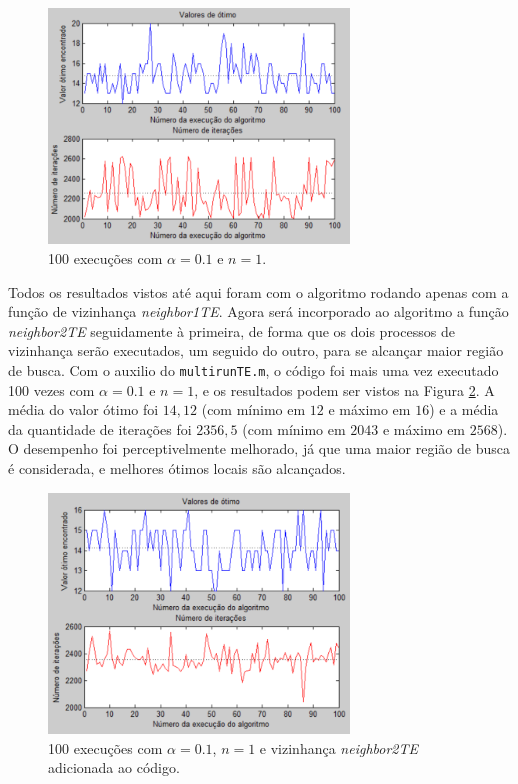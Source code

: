 \documentclass[conference]{IEEEtran}
\begin{document}
	\begin{figure}[h]
		\centering
		\includegraphics[width=8cm]{img/mult-result-5.png}
		\caption{100 execuções com $\alpha = 0.1$ e $n = 1$.}
		\label{fig:mult-result-5}
	\end{figure}
	
Todos os resultados vistos até aqui foram com o algoritmo rodando apenas com a função de vizinhança \textit{neighbor1TE}. Agora será incorporado ao algoritmo a função \textit{neighbor2TE} seguidamente à primeira, de forma que os dois processos de vizinhança serão executados, um seguido do outro, para se alcançar maior região de busca. Com o auxilio do \texttt{multirunTE.m}, o código foi mais uma vez executado 100 vezes com $\alpha = 0.1$ e $n = 1$, e os resultados podem ser vistos na Figura \ref{fig:mult-result-6}. A média do valor ótimo foi $14,12$ (com mínimo em $12$ e máximo em $16$) e a média da quantidade de iterações foi $2356,5$ (com mínimo em $2043$ e máximo em $2568$). O desempenho foi perceptivelmente melhorado, já que uma maior região de busca é considerada, e melhores ótimos locais são alcançados.

	\begin{figure}[h]
		\centering
		\includegraphics[width=8cm]{img/mult-result-6.png}
		\caption{100 execuções com $\alpha = 0.1$, $n = 1$ e vizinhança \textit{neighbor2TE} adicionada ao código.}
		\label{fig:mult-result-6}
	\end{figure}
	
\end{document}
